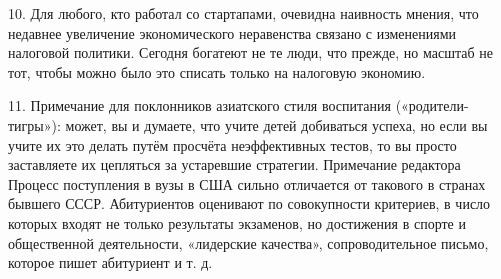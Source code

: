 \documentclass[ebook,12pt,oneside,openany]{memoir}
\begin{document}
10. Для любого, кто работал со стартапами, очевидна наивность мнения,
что недавнее увеличение экономического неравенства связано с
изменениями налоговой политики. Сегодня богатеют не те люди, что
прежде, но масштаб не тот, чтобы можно было это списать только на
налоговую экономию.

11. Примечание для поклонников азиатского стиля воспитания
(«родители-тигры»): может, вы и думаете, что учите детей добиваться
успеха, но если вы учите их это делать путём просчёта неэффективных
тестов, то вы просто заставляете их цепляться за устаревшие стратегии.
Примечание редактора Процесс поступления в вузы в США сильно
отличается от такового в странах бывшего СССР. Абитуриентов оценивают
по совокупности критериев, в число которых входят не только результаты
экзаменов, но достижения в спорте и общественной деятельности,
«лидерские качества», сопроводительное письмо, которое пишет
абитуриент и т. д.
\end{document}
